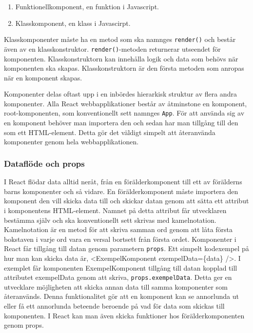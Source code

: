 \begin{enumerate}
    \item Funktionellkomponent, en funktion i Javascript.
    \item Klasskomponent, en klass i Javascirpt.
\end{enumerate}

Klasskomponenter måste ha en metod som ska namnges \texttt{render()} och består även av en klasskonstruktor. \texttt{render()}-metoden returnerar utseendet för komponenten. Klasskonstruktorn kan innehålla logik och data som behövs när komponenten ska skapas. Klasskonstruktorn är den första metoden som anropas när en komponent skapas.

Komponenter delas oftast upp i en inbördes hierarkisk struktur av flera andra komponenter. Alla React webbapplikationer består av åtminstone en komponent, root-komponenten, som konventionellt sett namnges \texttt{App}. För att använda sig av en komponent behöver man importera den och sedan har man tillgång till den som ett HTML-element. Detta gör det väldigt simpelt att återanvända komponenter genom hela webbapplikationen.


\subsubsection{Dataflöde och props}
I React flödar data alltid neråt\cite{react-states}, från en förälderkomponent till ett av förälderns barns komponenter och så vidare. En förälderkomponent måste importera den komponent den vill skicka data till och skickar datan genom att sätta ett attribut i komponentens HTML-element. Namnet på detta attribut får utvecklaren bestämma själv och ska konventionellt sett skrivas med kamelnotation. Kamelnotation är en metod för att skriva samman ord genom att låta första bokstaven i varje ord vara en versal bortsett från första ordet. Komponenter i React får tillgång till datan genom parametern \texttt{props}. Ett simpelt kodexempel på hur man kan skicka data är, <ExempelKomponent exempelData=\{data\} />. I exemplet får komponenten ExempelKomponent tillgång till datan kopplad till attributet exempelData genom att skriva, \texttt{props.exempelData}. Detta ger en utvecklare möjligheten att skicka annan data till samma komponenter som återanvänds. Denna funktionalitet gör att en komponent kan se annorlunda ut eller få ett annorlunda beteende beroende på vad för data som skickas till komponenten. I React kan man även skicka funktioner hos förälderkomponenten genom props. 

